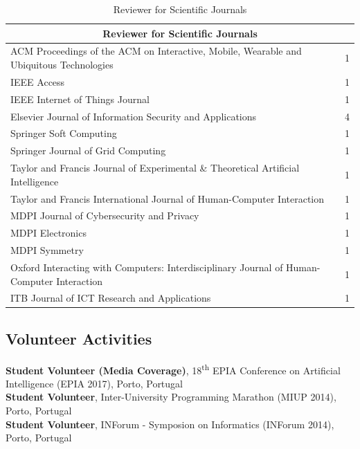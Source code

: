 \documentclass[10pt, a4paper]{article}
\newcommand{\Address}{Porto, Portugal}
\newcommand{\years}[1]{\marginnote{\raggedleft\footnotesize #1}}
\begin{document}
        \begin{table}[!htbp]
\small
    \centering
    \renewcommand{\arraystretch}{1.2}
    \begin{tabular}{p{13cm} c}
        \hline
         \multicolumn{2}{c}{\textbf{Reviewer for Scientific Journals}} \\
        \hline
        ACM Proceedings of the ACM on Interactive, Mobile, Wearable and Ubiquitous Technologies & 1 \\
        IEEE Access & 1 \\
        IEEE Internet of Things Journal & 1 \\
        Elsevier Journal of Information Security and Applications & 4 \\
        Springer Soft Computing & 1 \\
        Springer Journal of Grid Computing & 1 \\
        Taylor and Francis Journal of Experimental \& Theoretical Artificial Intelligence & 1 \\
        Taylor and Francis International Journal of Human-Computer Interaction & 1 \\
        MDPI Journal of Cybersecurity and Privacy & 1 \\
        MDPI Electronics & 1 \\
        MDPI Symmetry & 1 \\
        Oxford Interacting with Computers: Interdisciplinary Journal of Human-Computer Interaction & 1 \\
        ITB Journal of ICT Research and Applications & 1 \\
        \hline
    \end{tabular}
    \caption{Reviewer for Scientific Journals}
\end{table}


\subsection*{Volunteer Activities}

\years{2017} 
\textbf{Student Volunteer (Media Coverage)}, 18\textsuperscript{th} EPIA Conference on Artificial Intelligence (EPIA 2017), Porto, Portugal
\\[0.42em]
\years{2014} 
\textbf{Student Volunteer}, Inter-University Programming Marathon (MIUP 2014), \Address{}
\\[0.42em]
\textbf{Student Volunteer}, INForum - Symposion on Informatics (INForum 2014), \Address{}
\end{document}
